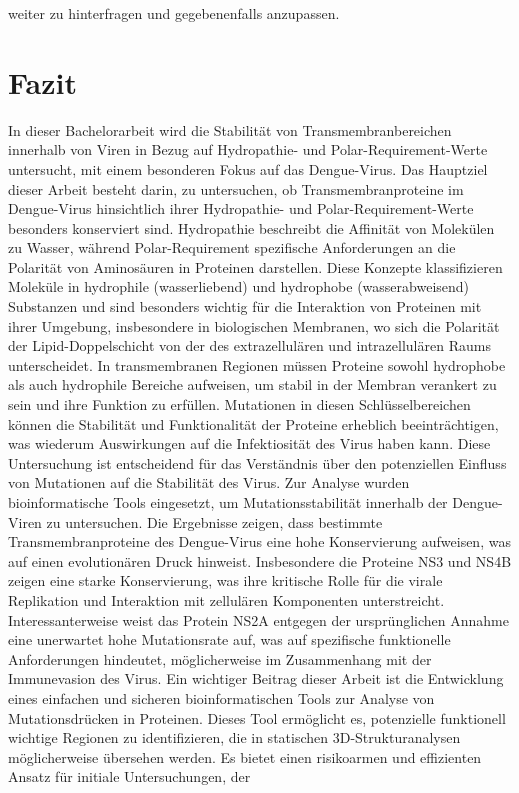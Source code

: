 \documentclass[german,version-2022-01]{uzl-thesis}
\begin{document}
weiter zu hinterfragen und gegebenenfalls anzupassen.

\chapter{Fazit}


%

In dieser Bachelorarbeit wird die Stabilit\"at von Transmembranbereichen innerhalb von Viren in Bezug auf Hydropathie- und Polar-Requirement-Werte untersucht, mit einem besonderen Fokus auf das Dengue-Virus. Das Hauptziel dieser Arbeit besteht darin, zu untersuchen, ob Transmembranproteine im Dengue-Virus hinsichtlich ihrer Hydropathie- und Polar-Requirement-Werte besonders konserviert sind. Hydropathie beschreibt die Affinit\"at von Molek\"ulen zu Wasser, w\"ahrend Polar-Requirement spezifische Anforderungen an die Polarit\"at von Aminos\"auren in Proteinen darstellen. Diese Konzepte klassifizieren Molek\"ule in hydrophile (wasserliebend) und hydrophobe (wasserabweisend) Substanzen und sind besonders wichtig f\"ur die Interaktion von Proteinen mit ihrer Umgebung, insbesondere in biologischen Membranen, wo sich die Polarit\"at der Lipid-Doppelschicht von der des extrazellul\"aren und intrazellul\"aren Raums unterscheidet. In transmembranen Regionen m\"ussen Proteine sowohl hydrophobe als auch hydrophile Bereiche aufweisen, um stabil in der Membran verankert zu sein und ihre Funktion zu erf\"ullen. Mutationen in diesen Schl\"usselbereichen k\"onnen die Stabilit\"at und Funktionalit\"at der Proteine erheblich beeintr\"achtigen, was wiederum Auswirkungen auf die Infektiosit\"at des Virus haben kann. Diese Untersuchung ist entscheidend f\"ur das Verst\"andnis \"uber den potenziellen Einfluss von Mutationen auf die Stabilit\"at des Virus. Zur Analyse wurden bioinformatische Tools eingesetzt, um Mutationsstabilit\"at innerhalb der Dengue-Viren zu untersuchen. Die Ergebnisse zeigen, dass bestimmte Transmembranproteine des Dengue-Virus eine hohe Konservierung aufweisen, was auf einen evolution\"aren Druck hinweist. Insbesondere die Proteine NS3 und NS4B zeigen eine starke Konservierung, was ihre kritische Rolle f\"ur die virale Replikation und Interaktion mit zellul\"aren Komponenten unterstreicht. Interessanterweise weist das Protein NS2A entgegen der urspr\"unglichen Annahme eine unerwartet hohe Mutationsrate auf, was auf spezifische funktionelle Anforderungen hindeutet, m\"oglicherweise im Zusammenhang mit der Immunevasion des Virus. Ein wichtiger Beitrag dieser Arbeit ist die Entwicklung eines einfachen und sicheren bioinformatischen Tools zur Analyse von Mutationsdr\"ucken in Proteinen. Dieses Tool erm\"oglicht es, potenzielle funktionell wichtige Regionen zu identifizieren, die in statischen 3D-Strukturanalysen m\"oglicherweise \"ubersehen werden. Es bietet einen risikoarmen und effizienten Ansatz f\"ur initiale Untersuchungen, der 
\end{document}
